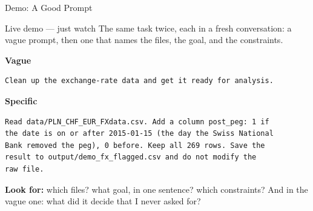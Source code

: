 \documentclass[aspectratio=169, 11pt]{beamer}
\begin{document}
\begin{frame}[fragile]{Demo: A Good Prompt}
  \begin{alertblock}{Live demo --- just watch}
    The same task twice, each in a fresh conversation: a vague prompt, then one that names the files, the goal, and the constraints.
  \end{alertblock}

  \vspace{0.2em}
  \textbf{Vague}
  \begin{lstlisting}[basicstyle=\ttfamily\footnotesize]
Clean up the exchange-rate data and get it ready for analysis.
  \end{lstlisting}

  \textbf{Specific}
  \begin{lstlisting}[basicstyle=\ttfamily\footnotesize]
Read data/PLN_CHF_EUR_FXdata.csv. Add a column post_peg: 1 if
the date is on or after 2015-01-15 (the day the Swiss National
Bank removed the peg), 0 before. Keep all 269 rows. Save the
result to output/demo_fx_flagged.csv and do not modify the
raw file.
  \end{lstlisting}

  \vspace{0.2em}
  {\footnotesize \textbf{Look for:} which files? what goal, in one sentence? which constraints? And in the vague one: what did it decide that I never asked for?}
\end{frame}

\end{document}
